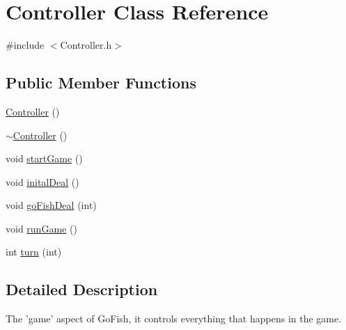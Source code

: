 \hypertarget{class_controller}{\section{Controller Class Reference}
\label{class_controller}
}


{\ttfamily \#include $<$Controller.\-h$>$}

\subsection*{Public Member Functions}
\begin{DoxyCompactItemize}
\item 
\hyperlink{class_controller_a95c56822d667e94b031451729ce069a9}{Controller} ()
\item 
\hyperlink{class_controller_a0ab87934c4f7a266cfdb86e0f36bc1b5}{$\sim$\-Controller} ()
\item 
void \hyperlink{class_controller_a3a9e81ea10c63eea81c2612ba3beb5c4}{start\-Game} ()
\item 
void \hyperlink{class_controller_aa2a6716682fa463fc3d6bbdb510630e5}{inital\-Deal} ()
\item 
void \hyperlink{class_controller_aa93207ee72313ca40934a10bf36adca9}{go\-Fish\-Deal} (int)
\item 
void \hyperlink{class_controller_ad65603733541eb7698575f02de8f639d}{run\-Game} ()
\item 
int \hyperlink{class_controller_a9f08004e5e9c6462d188be01d07befe8}{turn} (int)
\end{DoxyCompactItemize}


\subsection{Detailed Description}
The 'game' aspect of Go\-Fish, it controls everything that happens in the game. 

